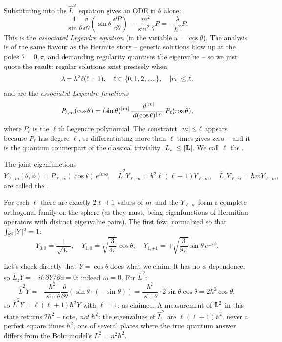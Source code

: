 \documentclass[a4paper]{scrartcl}
\begin{document}
Substituting into the $\hat{L}^2$ equation gives an ODE in $\theta$ alone:
$$
\frac{1}{\sin \theta} \frac{\dd}{\dd \theta}\left( \sin \theta \, \frac{\dd P}{\dd \theta} \right) - \frac{m^2}{\sin^2 \theta} P = -\frac{\lambda}{\hbar^2} P.
$$
This is the \emph{associated Legendre equation} (in the variable $u = \cos\theta$). The analysis is of the same flavour as the Hermite story -- generic solutions blow up at the poles $\theta = 0, \pi$, and demanding regularity quantises the eigenvalue -- so we just quote the result: regular solutions exist precisely when
$$
\lambda = \hbar^2 \ell(\ell + 1), \quad \ell \in \{0, 1, 2, \dots\}, \quad \lvert m\rvert \leq \ell,
$$
and are the \emph{associated Legendre functions}
$$
P_{\ell, m}(\cos \theta) = (\sin \theta)^{\lvert m\rvert} \, \frac{\; d^{\lvert m\rvert}}{\; d (\cos\theta)^{\lvert m\rvert}} P_\ell(\cos \theta),
$$
where $P_\ell$ is the $\ell$th Legendre polynomial. The constraint $\lvert m\rvert \leq \ell$ appears because $P_\ell$ has degree $\ell$, so differentiating more than $\ell$ times gives zero -- and it is the quantum counterpart of the classical triviality $\lvert L_z\rvert \leq \lvert\mathbf{L}\rvert$. We call $\ell$ the .

\begin{definition}
    The joint eigenfunctions
    $$
    Y_{\ell, m}(\theta, \phi) = P_{\ell, m}(\cos\theta) \, e^{i m \phi}, \quad \hat{L}^2 Y_{\ell,m} = \hbar^2 \ell(\ell+1) Y_{\ell, m}, \quad \hat{L}_z Y_{\ell, m} = \hbar m Y_{\ell, m},
    $$
    are called the .
\end{definition}

For each $\ell$ there are exactly $2\ell + 1$ values of $m$, and the $Y_{\ell,m}$ form a complete orthogonal family on the sphere (as they must, being eigenfunctions of Hermitian operators with distinct eigenvalue pairs). The first few, normalised so that $\int_{S^2} \lvert Y\rvert^2 = 1$:
$$
Y_{0,0} = \frac{1}{\sqrt{4\pi}}, \quad
Y_{1,0} = \sqrt{\frac{3}{4 \pi}} \cos \theta, \quad
Y_{1, \pm 1} = \mp \sqrt{\frac{3}{8\pi}} \sin\theta \, e^{\pm i \phi}.
$$
\begin{example}[Verifying $Y_{1,0}$]
    Let's check directly that $Y = \cos\theta$ does what we claim. It has no $\phi$ dependence, so $\hat{L}_z Y = -i\hbar \, \partial Y/\partial\phi = 0$: indeed $m = 0$. For $\hat{L}^2$:
    $$
    \hat{L}^2 Y = -\frac{\hbar^2}{\sin\theta}\frac{\partial}{\partial \theta}\left( \sin\theta \cdot (-\sin\theta) \right)
    = \frac{\hbar^2}{\sin \theta} \cdot 2 \sin\theta\cos\theta = 2 \hbar^2 \cos \theta,
    $$
    so $\hat{L}^2 Y = \ell(\ell+1)\hbar^2 Y$ with $\ell = 1$, as claimed. A measurement of $\mathbf{L}^2$ in this state returns $2\hbar^2$ -- note, \emph{not} $\hbar^2$: the eigenvalues of $\hat{L}^2$ are $\ell(\ell+1)\hbar^2$, never a perfect square times $\hbar^2$, one of several places where the true quantum answer differs from the Bohr model's $L^2 = n^2 \hbar^2$.
\end{example}
\end{document}
